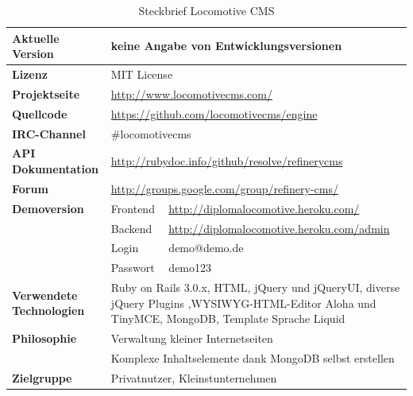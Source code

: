 \begin{table}[!h]
\caption{Steckbrief Locomotive CMS}
\begin{tabular}[!ht]{|l|l|l|}
\hline
\textbf{Aktuelle Version} & \multicolumn{2}{p{10cm}|}{keine Angabe von Entwicklungsversionen} \\
\hline
\textbf{Lizenz} & \multicolumn{2}{p{10cm}|}{MIT License} \\
\hline
\textbf{Projektseite} & \multicolumn{2}{p{10cm}|}{\href{http://www.locomotivecms.com/}{http://www.locomotivecms.com/}} \\
\hline
\textbf{Quellcode} & \multicolumn{2}{p{10cm}|}{\href{https://github.com/locomotivecms/engine}{https://github.com/locomotivecms/engine}} \\
\hline
\textbf{IRC-Channel} & \multicolumn{2}{p{10cm}|}{\#locomotivecms} \\
\hline
\textbf{API Dokumentation} & \multicolumn{2}{p{10cm}|}{\href{http://rubydoc.info/github/resolve/refinerycms}{http://rubydoc.info/github/resolve/refinerycms}} \\
\hline
\textbf{Forum} & \multicolumn{2}{p{10cm}|}{\href{http://groups.google.com/group/refinery-cms/}{http://groups.google.com/group/refinery-cms/}} \\
\hline
\textbf{Demoversion} & Frontend & \href{http://diplomalocomotive.heroku.com/}{http://diplomalocomotive.heroku.com/} \\
\cline{2-3}
& Backend & \href{http://diplomalocomotive.heroku.com/admin}{http://diplomalocomotive.heroku.com/admin} \\
\cline{2-3}
& Login & demo@demo.de \\
\cline{2-3}
& Passwort & demo123 \\
\hline
\textbf{Verwendete Technologien} & \multicolumn{2}{p{10cm}|}{Ruby on Rails 3.0.x, HTML, jQuery und jQueryUI, diverse jQuery Plugins ,WYSIWYG-HTML-Editor Aloha und TinyMCE, MongoDB, Template Sprache Liquid} \\
\hline
\textbf{Philosophie} & \multicolumn{2}{p{10cm}|}{Verwaltung kleiner Internetseiten} \\
& \multicolumn{2}{p{10cm}|}{Komplexe Inhaltselemente dank MongoDB selbst erstellen}\\
\hline
\textbf{Zielgruppe} & \multicolumn{2}{p{10cm}|}{Privatnutzer, Kleinstunternehmen} \\
\hline
\end{tabular}
\end{table}
